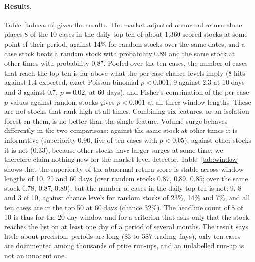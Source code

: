 \paragraph{Results.} Table~\ref{tab:cases} gives the results. The market-adjusted abnormal return alone places 8 of the 10 cases in the daily top ten of about 1,360 scored stocks at some point of their period, against 14\% for random stocks over the same dates, and a case stock beats a random stock with probability 0.89 and the same stock at other times with probability 0.87. Pooled over the ten cases, the number of cases that reach the top ten is far above what the per-case chance levels imply (8 hits against 1.4 expected, exact Poisson-binomial $p<0.001$; 9 against 2.3 at 10 days and 3 against 0.7, $p=0.02$, at 60 days), and Fisher's combination of the per-case $p$-values against random stocks gives $p<0.001$ at all three window lengths. These are not stocks that rank high at all times. Combining six features, or an isolation forest on them, is no better than the single feature. Volume surge behaves differently in the two comparisons: against the same stock at other times it is informative (superiority 0.90, five of ten cases with $p<0.05$), against other stocks it is not (0.33), because other stocks have larger surges at some time; we therefore claim nothing new for the market-level detector. Table~\ref{tab:window} shows that the superiority of the abnormal-return score is stable across window lengths of 10, 20 and 60 days (over random stocks 0.87, 0.89, 0.85; over the same stock 0.78, 0.87, 0.89), but the number of cases in the daily top ten is not: 9, 8 and 3 of 10, against chance levels for random stocks of 23\%, 14\% and 7\%, and all ten cases are in the top 50 at 60 days (chance 32\%). The headline count of 8 of 10 is thus for the 20-day window and for a criterion that asks only that the stock reaches the list on at least one day of a period of several months. The result says little about precision: periods are long (83 to 587 trading days), only ten cases are documented among thousands of price run-ups, and an unlabelled run-up is not an innocent one.

\begin{table}[t]
\centering\footnotesize
{}
\caption{Ten documented cases scored against about 1,360 stocks (20-day window). Superiority is the probability that a case stock beats a random stock (0.5 is chance); ``top $B$'' counts cases in which the stock reached the daily top-$B$ list at some date of its period; ``chance'' is the same share for random stocks.}\label{tab:cases}
\end{table}

